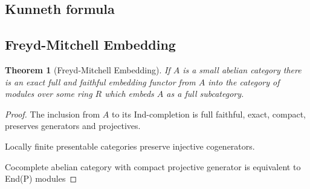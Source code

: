 \documentclass[12pt]{article}
\numberwithin{equation}{section}
\newtheorem{theorem}{Theorem}[section]
\begin{document}
	\subsection{Kunneth formula}
	\subsection{Freyd-Mitchell Embedding}
	\begin{theorem}[Freyd-Mitchell Embedding]
		If $A$ is a small abelian category there is an exact full and faithful embedding functor from $A$ into the category of modules over some ring $R$ which embeds $A$ as a full subcategory.
	\end{theorem}
	\begin{proof}
		The inclusion from $A$ to its Ind-completion is full faithful, exact, compact, preserves generators and projectives.
		
		Locally finite presentable categories preserve injective cogenerators.
		
		Cocomplete abelian category with compact projective	generator is equivalent to End(P) modules
	\end{proof}
	
\end{document}
